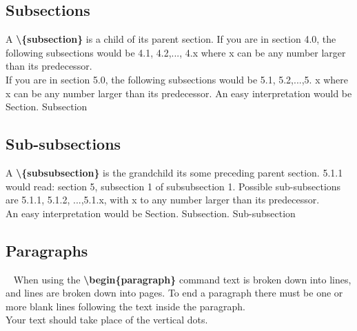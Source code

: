 \subsection{Subsections}
A \textbf{\textbackslash{\{subsection\}}} is a child of its 
parent section. If you are in section 4.0, the following 
subsections would be 4.1, 4.2,..., 4.x where x can be any 
number larger than its predecessor.  \\

If you are in section 5.0, the following subsections would be 
5.1, 5.2,...,5. {\color{blue} x} where {\color{blue} x} can be any 
number larger than its predecessor. An easy interpretation would be 
{\color{red} Section}.{\color{blue} Subsection}\\

\subsection{Sub-subsections}
A \textbf{\textbackslash{\{subsubsection\}}} is the grandchild its some 
preceding parent section. 5.1.1 would read: section 5, subsection 1 
of subsubsection 1. Possible sub-subsections are 
5.1.1, 5.1.2, ...,5.1.{\color{DarkGreen}x}, with {\color{DarkGreen}x} to any 
number larger than its predecessor.\\ 
An easy interpretation would be {\color{red} Section}.
{\color{blue} Subsection}.{\color{DarkGreen} Sub-subsection}\\

\subsection{Paragraphs} ~\cite{latex_wikia} 
When using the \textbf{\textbackslash{begin}\{paragraph\}} 
command text is broken down into lines, 
and lines are broken down into pages. To end a 
paragraph there must be one or more blank lines 
following the text inside the paragraph.\\ 

Your text should take place of the vertical dots.\\
\\

